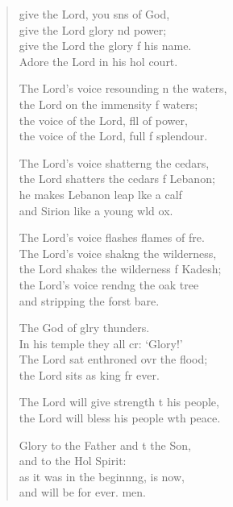 \settowidth{\versewidth}{The Lord’s voice resounding on the waters, *}
\begin{verse}%
  \begin{patverse}
     give the Lord, you sns of God,\Med\\
    give the Lord glory nd power;\\
give the Lord the glory f his name.\Med\\
    Adore the Lord in his hol court.

The Lord’s voice resounding n the waters,\Med\\
    the Lord on the immensity f waters;\\
the voice of the Lord, fll of power,\Med\\
    the voice of the Lord, full f splendour.

The Lord’s voice shatterng the cedars,\Med\\
    the Lord shatters the cedars f Lebanon;\\
he makes Lebanon leap lke a calf\Med\\
    and Sirion like a young w\pointup{\i}ld ox.

The Lord’s voice flashes flames of f\pointup{\i}re.\Flex\\
    The Lord’s voice shakng the wilderness,\Med\\
    the Lord shakes the wilderness f Kadesh;\\
the Lord’s voice rendng the oak tree\Med\\
    and stripping the forst bare.

The God of glry thunders.\Med\\
    In his temple they all cr: ‘Glory!’\\
The Lord sat enthroned ovr the flood;\Med\\
    the Lord sits as king fr ever.

The Lord will give strength t his people,\Med\\
    the Lord will bless his people w\pointup{\i}th peace.

Glory to the Father and t the Son,\Med\\
    and to the Hol Spirit:\\
as it was in the beginnng, is now,\Med\\
    and will be for ever. men.
  \end{patverse}
\end{verse}
